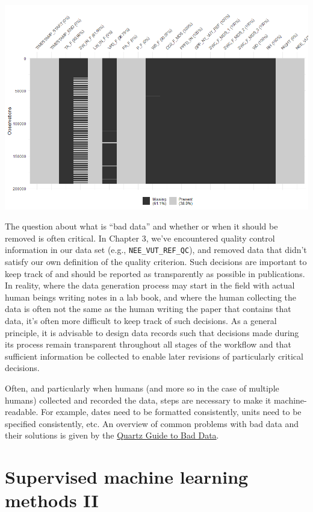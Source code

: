 \documentclass[
]{book}
\begin{document}
\includegraphics{./figures/missing_data_visdat.png}

The question about what is ``bad data'' and whether or when it should be removed is often critical. In Chapter 3, we've encountered quality control information in our data set (e.g., \texttt{NEE\_VUT\_REF\_QC}), and removed data that didn't satisfy our own definition of the quality criterion. Such decisions are important to keep track of and should be reported as transparently as possible in publications. In reality, where the data generation process may start in the field with actual human beings writing notes in a lab book, and where the human collecting the data is often not the same as the human writing the paper that contains that data, it's often more difficult to keep track of such decisions. As a general principle, it is advisable to design data records such that decisions made during its process remain transparent throughout all stages of the workflow and that sufficient information be collected to enable later revisions of particularly critical decisions.

Often, and particularly when humans (and more so in the case of multiple humans) collected and recorded the data, steps are necessary to make it machine-readable. For example, dates need to be formatted consistently, units need to be specified consistently, etc. An overview of common problems with bad data and their solutions is given by the \href{https://github.com/Quartz/bad-data-guide\#spelling-is-inconsistent}{Quartz Guide to Bad Data}.

\hypertarget{supervised-machine-learning-methods-ii}{%
\chapter{Supervised machine learning methods II}\label{supervised-machine-learning-methods-ii}}
\end{document}
